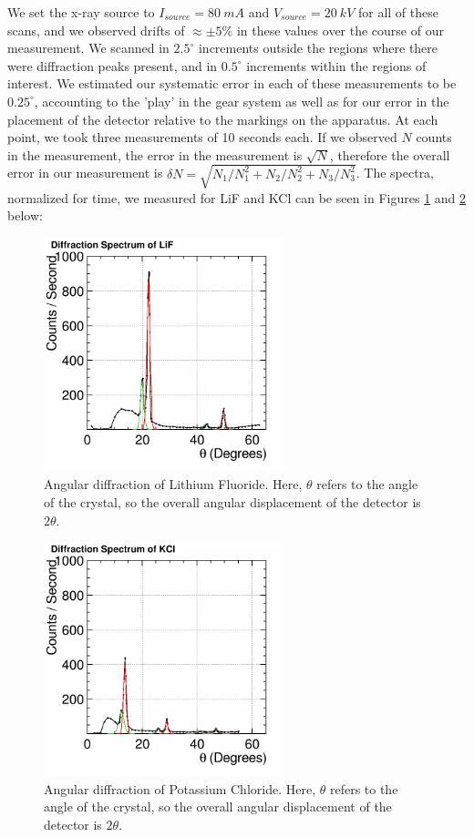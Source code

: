 \documentclass[%
 reprint,
 amsmath,amssymb,
 aps,
 pra,
]{revtex4-1}
\begin{document}
We set the x-ray source to $I_{source} = 80~mA$ and $V_{source} = 20~kV$ for all of these scans, and we observed drifts of $\approx \pm 5\%$ in these values over the course of our measurement. We scanned in $2.5^\circ$ increments outside the regions where there were diffraction peaks present, and in $0.5^\circ$ increments within the regions of interest. We estimated our systematic error in each of these measurements to be $0.25^\circ$, accounting to the 'play' in the gear system as well as for our error in the placement of the detector relative to the markings on the apparatus. At each point, we took three measurements of 10 seconds each. If we observed $N$ counts in the measurement, the error in the measurement is $\sqrt{N}$, therefore the overall error in our measurement is $\delta N =\sqrt{N_1/N_1^2 + N_2/N_2^2 + N_3/N_3^2}$. The spectra, normalized for time, we measured for LiF and KCl can be seen in Figures \ref{fig:LiF} and \ref{fig:KCl} below:

\begin{figure}[H]
	\centering
	\includegraphics[width=7cm]{Diffraction_LiF.png}
	\caption{Angular diffraction of Lithium Fluoride. Here, $\theta$ refers to the angle of the crystal, so the overall angular displacement of the detector is $2 \theta$.}
	\label{fig:LiF}
\end{figure}

\begin{figure}[H]
	\centering
	\includegraphics[width=7cm]{Diffraction_KCl.png}
	\caption{Angular diffraction of Potassium Chloride. Here, $\theta$ refers to the angle of the crystal, so the overall angular displacement of the detector is $2 \theta$.}
	\label{fig:KCl}
\end{figure}
\end{document}
